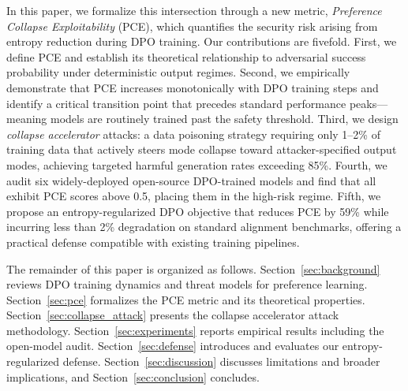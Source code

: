 In this paper, we formalize this intersection through a new metric, \textit{Preference Collapse Exploitability} (PCE), which quantifies the security risk arising from entropy reduction during DPO training. Our contributions are fivefold. First, we define PCE and establish its theoretical relationship to adversarial success probability under deterministic output regimes. Second, we empirically demonstrate that PCE increases monotonically with DPO training steps and identify a critical transition point that precedes standard performance peaks---meaning models are routinely trained past the safety threshold. Third, we design \textit{collapse accelerator} attacks: a data poisoning strategy requiring only 1--2\% of training data that actively steers mode collapse toward attacker-specified output modes, achieving targeted harmful generation rates exceeding 85\%. Fourth, we audit six widely-deployed open-source DPO-trained models and find that all exhibit PCE scores above 0.5, placing them in the high-risk regime. Fifth, we propose an entropy-regularized DPO objective that reduces PCE by 59\% while incurring less than 2\% degradation on standard alignment benchmarks, offering a practical defense compatible with existing training pipelines.

The remainder of this paper is organized as follows. Section~\ref{sec:background} reviews DPO training dynamics and threat models for preference learning. Section~\ref{sec:pce} formalizes the PCE metric and its theoretical properties. Section~\ref{sec:collapse_attack} presents the collapse accelerator attack methodology. Section~\ref{sec:experiments} reports empirical results including the open-model audit. Section~\ref{sec:defense} introduces and evaluates our entropy-regularized defense. Section~\ref{sec:discussion} discusses limitations and broader implications, and Section~\ref{sec:conclusion} concludes.
